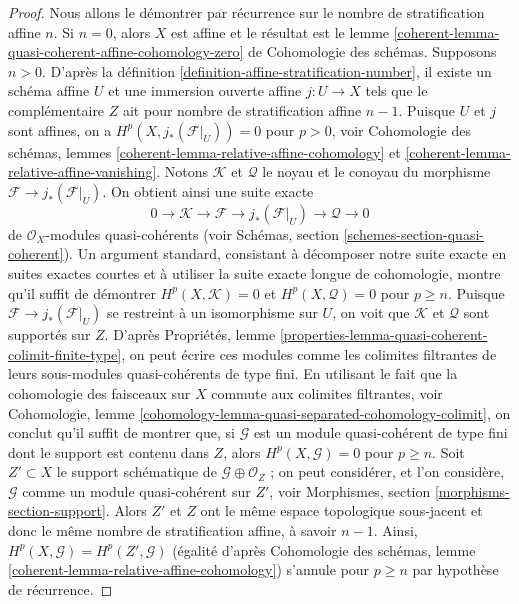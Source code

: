\begin{proof}
Nous allons le démontrer par récurrence sur le nombre de stratification affine $n$.
Si $n = 0$, alors $X$ est affine et le résultat est le
lemme
\ref{coherent-lemma-quasi-coherent-affine-cohomology-zero} de Cohomologie des schémas.
Supposons $n > 0$. D'après la définition \ref{definition-affine-stratification-number},
il existe un schéma affine $U$ et une immersion ouverte affine $j : U \to X$
tels que le complémentaire $Z$ ait pour nombre de stratification affine $n - 1$.
Puisque $U$ et $j$ sont affines, on a $H^p(X, j_*(\mathcal{F}|_U)) = 0$
pour $p > 0$, voir Cohomologie des schémas, lemmes
\ref{coherent-lemma-relative-affine-cohomology} et
\ref{coherent-lemma-relative-affine-vanishing}.
Notons $\mathcal{K}$ et $\mathcal{Q}$ le noyau et le conoyau
du morphisme $\mathcal{F} \to j_*(\mathcal{F}|_U)$. On obtient ainsi
une suite exacte
$$
0 \to \mathcal{K} \to \mathcal{F} \to j_*(\mathcal{F}|_U)
\to \mathcal{Q} \to 0
$$
de $\mathcal{O}_X$-modules quasi-cohérents (voir
Schémas, section \ref{schemes-section-quasi-coherent}).
Un argument standard, consistant à décomposer notre suite exacte en suites exactes
courtes et à utiliser la suite exacte longue de cohomologie,
montre qu'il suffit de démontrer $H^p(X, \mathcal{K}) = 0$
et $H^p(X, \mathcal{Q}) = 0$ pour $p \geq n$.
Puisque $\mathcal{F} \to j_*(\mathcal{F}|_U)$ se restreint
à un isomorphisme sur $U$, on voit que $\mathcal{K}$
et $\mathcal{Q}$ sont supportés sur $Z$.
D'après Propriétés, lemme
\ref{properties-lemma-quasi-coherent-colimit-finite-type},
on peut écrire ces modules comme les colimites filtrantes de
leurs sous-modules quasi-cohérents de type fini.
En utilisant le fait que la cohomologie des faisceaux sur $X$ commute
aux colimites filtrantes, voir
Cohomologie, lemme \ref{cohomology-lemma-quasi-separated-cohomology-colimit},
on conclut qu'il suffit de montrer que, si $\mathcal{G}$
est un module quasi-cohérent de type fini dont le support
est contenu dans $Z$, alors $H^p(X, \mathcal{G}) = 0$ pour $p \geq n$.
Soit $Z' \subset X$ le support schématique de
$\mathcal{G} \oplus \mathcal{O}_Z$ ; on peut considérer, et l'on considère,
$\mathcal{G}$ comme un module quasi-cohérent sur $Z'$, voir
Morphismes, section \ref{morphisms-section-support}.
Alors $Z'$ et $Z$ ont le même espace topologique sous-jacent
et donc le même nombre de stratification affine, à savoir $n - 1$.
Ainsi, $H^p(X, \mathcal{G}) = H^p(Z', \mathcal{G})$
(égalité d'après Cohomologie des schémas, lemme
\ref{coherent-lemma-relative-affine-cohomology})
s'annule pour $p \geq n$ par hypothèse de récurrence.
\end{proof}

